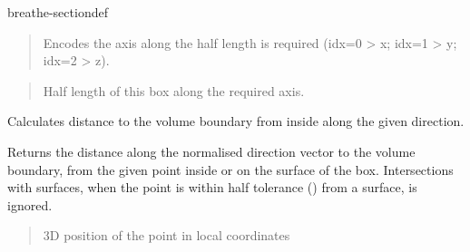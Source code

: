 \documentclass[letterpaper,10pt,english]{sphinxmanual}
\begin{document}
\begin{fulllineitems}
\begin{sphinxuseclass}{breathe-sectiondef}
\begin{fulllineitems}
\sphinxAtStartPar
\begin{quote}\begin{description}
\sphinxAtStartPar
\sphinxstylestrong{{[}in{]}} Encodes the axis along the half length is required (idx=0 \textendash{}\textgreater{} x; idx=1 \textendash{}\textgreater{} y; idx=2 \textendash{}\textgreater{} z). 

\end{description}\end{quote}
\begin{quote}\begin{description}
\sphinxAtStartPar
Half length of this box along the required axis. 

\end{description}\end{quote}


\end{fulllineitems}


\begin{fulllineitems}
\label{\detokenize{Simulation/SimulationCodeDoc:_CPPv4NK3Box13DistanceToOutEPdPd}}
\pysigstartsignatures
\pysigstartmultiline
{}
\pysigstopmultiline
\pysigstopsignatures
\sphinxAtStartPar
Calculates distance to the volume boundary from inside along the given direction. 

\sphinxAtStartPar
Returns the distance along the normalised direction vector  to the volume boundary, from the given point  inside or on the surface of the box. Intersections with surfaces, when the point is within half tolerance () from a surface, is ignored.

\sphinxAtStartPar
\begin{quote}\begin{description}
\sphinxAtStartPar
\sphinxstylestrong{{[}in{]}} 3D position of the point in local coordinates 


\end{description}
\end{quote}
\end{fulllineitems}
\end{sphinxuseclass}
\end{fulllineitems}
\end{document}
